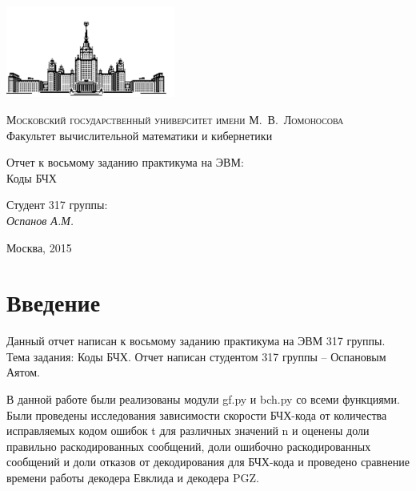 \documentclass[12pt, a4paper]{article}
\begin{document}
	\thispagestyle{empty}

	\begin{singlespace}
	\begin{titlepage}
		\begin{center}
			\includegraphics[height = 3cm]{msu.png}

			{\scshape Московский государственный университет имени М.~В.~Ломоносова}\\
			Факультет вычислительной математики и кибернетики\\
			\centerline{\hfill\hrulefill\hrulefill\hrulefill\hrulefill\hfill}

			\vfill

			{\LARGE Отчет к восьмому заданию практикума на ЭВМ: \\ Коды БЧХ}

			\vspace{1cm}

		\end{center}

		\vfill
		\begin{flushright}
			Студент 317 группы:\\
				\textit{Оспанов А.М.}

			\vspace{5mm}

		\end{flushright}

		\vfill

		\begin{center}
		Москва, 2015
		\end{center}
	\end{titlepage}
	\end{singlespace}

	\tableofcontents


	\newpage
	\section{Введение}
		Данный отчет написан к восьмому заданию практикума на ЭВМ 317 группы. Тема задания: Коды БЧХ. Отчет написан студентом 317 группы -- Оспановым Аятом.

		В данной работе были реализованы модули gf.py и bch.py со всеми функциями. Были проведены исследования зависимости скорости БЧХ-кода от количества исправляемых кодом ошибок t для различных значений n и оценены доли правильно раскодированных сообщений, доли ошибочно раскодированных сообщений и доли отказов от декодирования для БЧХ-кода и проведено сравнение времени работы декодера Евклида и декодера PGZ.
\end{document}
